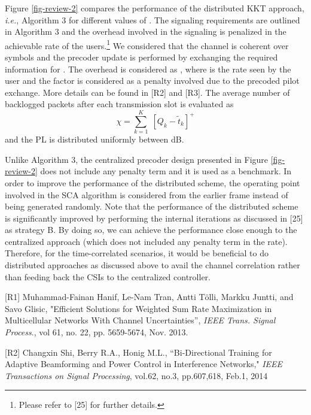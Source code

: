 \begin{enumerate}
\begin{itemize}
Figure \ref{fig-review-2} compares the performance of the distributed \ac{KKT} approach, \textit{i.e.}, Algorithm 3 for different values of . The signaling requirements are outlined in Algorithm 3 and the overhead involved in the signaling is penalized in the achievable rate of the users.\footnote{Please refer to [25] for further details.} We considered that the channel is coherent over  symbols and the precoder update is performed by exchanging the required information for . The overhead is considered as , where  is the rate seen by the user and the factor  is considered as a penalty involved due to the precoded pilot exchange. More details can be found in [R2] and [R3]. The average number of backlogged packets after each transmission slot is evaluated as 
\begin{equation}
\chi = \sum_{k = 1}^K \; [ Q_k - \tilde{t}_k ]^+
\end{equation}
and the \ac{PL} is distributed uniformly between \eqn{[0,-3]} dB.

Unlike Algorithm 3, the centralized precoder design presented in Figure \ref{fig-review-2} does not include any penalty term and it is used as a benchmark. In order to improve the performance of the distributed scheme, the operating point involved in the \ac{SCA} algorithm is considered from the earlier frame instead of being generated randomly. Note that the performance of the distributed scheme is significantly improved by performing the internal iterations as discussed in [25] as strategy B. By doing so, we can achieve the performance close enough to the centralized approach (which does not included any penalty term in the rate). Therefore, for the time-correlated scenarios, it would be beneficial to do distributed approaches as discussed above to avail the channel correlation rather than feeding back the \acp{CSI} to the centralized controller.

\end{itemize}	

\vspace{1eM}
[R1] Muhammad-Fainan Hanif, Le-Nam Tran, Antti T\"{o}lli, Markku Juntti,  and Savo Glisic, "{Efficient Solutions for Weighted Sum Rate Maximization in Multicellular Networks With Channel Uncertainties}'', \textit{IEEE Trans. Signal Process}., vol 61, no. 22, pp. 5659-5674, Nov. 2013.

[R2] Changxin Shi, Berry R.A., Honig M.L., ``{Bi-Directional Training for Adaptive Beamforming and Power Control in Interference Networks}," \textit{IEEE Transactions on Signal Processing}, vol.62, no.3, pp.607,618, Feb.1, 2014


\end{enumerate}
